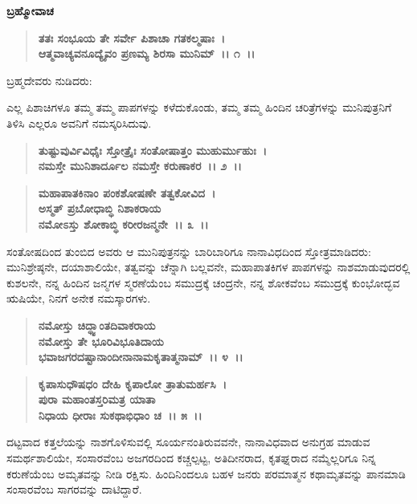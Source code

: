 \emptypage

\begin{flushleft}
\textbf{ಬ್ರಹ್ಮೋವಾಚ\enginline{-}}
\end{flushleft}

\begin{verse}
\textbf{ತತಃ ಸಂಭೂಯ ತೇ ಸರ್ವೇ ಪಿಶಾಚಾ ಗತಕಲ್ಮಷಾಃ~।}\\\textbf{ಆತ್ಮವಾಚ್ಯವನೂದ್ಯೈವಂ ಪ್ರಣಮ್ಯ ಶಿರಸಾ ಮುನಿಮ್~।। ೧~।।}
\end{verse}

\begin{flushleft}
ಬ್ರಹ್ಮದೇವರು ನುಡಿದರು:
\end{flushleft}

ಎಲ್ಲ ಪಿಶಾಚಿಗಳೂ ತಮ್ಮ ತಮ್ಮ ಪಾಪಗಳನ್ನು ಕಳೆದುಕೊಂಡು, ತಮ್ಮ ತಮ್ಮ ಹಿಂದಿನ ಚರಿತ್ರೆಗಳನ್ನು ಮುನಿಪುತ್ರನಿಗೆ ತಿಳಿಸಿ ಎಲ್ಲರೂ ಅವನಿಗೆ ನಮಸ್ಕರಿಸಿದುವು.

\begin{verse}
\textbf{ತುಷ್ಟುವುರ್ವಿವಿಧೈಃ ಸ್ತೋತ್ರೈಃ ಸಂತೋಷಾತ್ತಂ ಮುಹುರ್ಮುಹುಃ~।}\\\textbf{ನಮಸ್ತೇ ಮುನಿಶಾರ್ದೂಲ ನಮಸ್ತೇ ಕರುಣಾಕರ~।। ೨~।। }
\end{verse}

\begin{verse}
\textbf{ಮಹಾಪಾತಕಿನಾಂ ಪಂಕಶೋಷಣೇ ತತ್ವಕೋವಿದ~।}\\\textbf{ಅಸ್ಮತ್ ಪ್ರಬೋಧಾಬ್ಧಿ ನಿಶಾಕರಾಯ} \\\textbf{ನಮೋಽಸ್ತು ಶೋಕಾಬ್ಧಿ ಕರೀರಜನ್ಮನೇ~।। ೩~।।}
\end{verse}

ಸಂತೋಷದಿಂದ ತುಂಬಿದ ಅವರು ಆ ಮುನಿಪುತ್ರನನ್ನು ಬಾರಿಬಾರಿಗೂ ನಾನಾವಿಧದಿಂದ ಸ್ತೋತ್ರಮಾಡಿದರು: ಮುನಿಶ್ರೇಷ್ಠನೇ, ದಯಾಶಾಲಿಯೇ, ತತ್ವವನ್ನು ಚೆನ್ನಾಗಿ ಬಲ್ಲವನೇ, ಮಹಾಪಾತಕಿಗಳ ಪಾಪಗಳನ್ನು ನಾಶಮಾಡುವುದರಲ್ಲಿ ಕುಶಲನೇ, ನನ್ನ ಹಿಂದಿನ ಜನ್ಮಗಳ ಸ್ಮರಣೆಯೆಂಬ ಸಮುದ್ರಕ್ಕೆ ಚಂದ್ರನೇ, ನನ್ನ ಶೋಕವೆಂಬ ಸಮುದ್ರಕ್ಕೆ ಕುಂಭೋದ್ಭವ ಋಷಿಯೇ, ನಿನಗೆ ಅನೇಕ ನಮಸ್ಕಾರಗಳು.

\begin{verse}
\textbf{ನಮೋಸ್ತು ಚಿದ್ಧ್ವಾಂತದಿವಾಕರಾಯ} \\\textbf{ನಮೋಸ್ತು ತೇ ಭೂರಿವಿಭೂತಿದಾಯ}\\\textbf{ಭವಾಜಗರದಷ್ಟಾನಾಂದೀನಾನಾಮಕೃತಾತ್ಮನಾಮ್~।। ೪~।।} 
\end{verse}

\begin{verse}
\textbf{ಕೃಪಾಸುಧೌಷಧಂ ದೇಹಿ ಕೃಪಾಲೋ ತ್ರಾತುಮರ್ಹಸಿ~।}\\\textbf{ಪುರಾ ಮಹಾಂತಸ್ತರಿಮತ್ರ ಯಾತಾ}\\\textbf{ನಿಧಾಯ ಧೀರಾಃ ಸುಕಥಾಭಿಧಾಂ ಚ~।। ೫~।।}
\end{verse}

ದಟ್ಟವಾದ ಕತ್ತಲೆಯನ್ನು ನಾಶಗೊಳಿಸುವಲ್ಲಿ ಸೂರ್ಯನಂತಿರುವವನೇ, ನಾನಾವಿಧವಾದ ಅನುಗ್ರಹ ಮಾಡುವ ಸಮರ್ಥಶಾಲಿಯೇ, ಸಂಸಾರವೆಂಬ ಅಜಗರದಿಂದ ಕಚ್ಚಲ್ಪಟ್ಟ, ಅತಿ\-ದೀನರಾದ, ಕೃತಘ್ನರಾದ ನಮ್ಮೆಲ್ಲರಿಗೂ ನಿನ್ನ ಕರುಣೆಯೆಂಬ ಅಮೃತವನ್ನು ನೀಡಿ ರಕ್ಷಿಸು. ಹಿಂದಿನಿಂದಲೂ ಬಹಳ ಜನರು ಪರಮಾತ್ಮನ ಕಥಾಮೃತವನ್ನು ಪಾನಮಾಡಿ ಸಂಸಾರವೆಂಬ ಸಾಗರವನ್ನು ದಾಟಿದ್ದಾರೆ.

